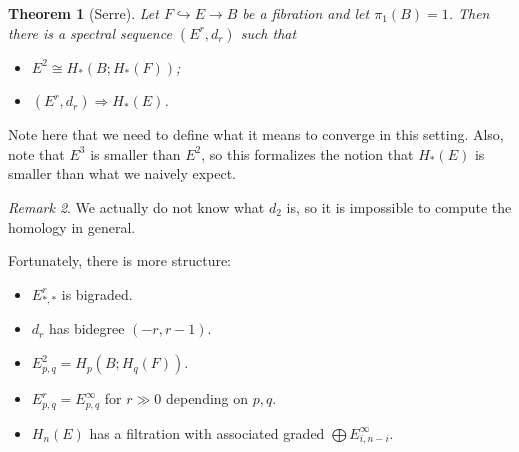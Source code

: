 \documentclass[leqno, openany]{memoir}
\newtheorem{thm}{Theorem}[section]
\theoremstyle{definition}
\theoremstyle{remark}
\newtheorem{rmk}[thm]{Remark}
\theoremstyle{plain}
\theoremstyle{definition}
\theoremstyle{remark}
\begin{document}
\begin{thm}[Serre]
    Let $F \hookrightarrow E \to B$ be a fibration and let $\pi_1(B) = 1$. Then there is a spectral sequence $(E^r, d_r)$ such that
    \begin{itemize}
        \item $E^2 \cong H_*(B; H_*(F))$;
        \item $(E^r, d_r) \Rightarrow H_*(E)$.
    \end{itemize}
\end{thm}

Note here that we need to define what it means to converge in this setting. Also, note that $E^3$ is smaller than $E^2$, so this formalizes the notion that $H_*(E)$ is smaller than what we naively expect.

\begin{rmk}
    We actually do not know what $d_2$ is, so it is impossible to compute the homology in general.
\end{rmk}

Fortunately, there is more structure:
\begin{itemize}
    \item $E^r_{*,*}$ is bigraded.
    \item $d_r$ has bidegree $(-r, r-1)$.
    \item $E_{p,q}^2 = H_p(B; H_q(F))$.
    \item $E_{p,q}^r = E_{p,q}^{\infty}$ for $r \gg 0$ depending on $p,q$.
    \item $H_n(E)$ has a filtration with associated graded $\bigoplus E_{i, n-i}^{\infty}$.
\end{itemize}
\end{document}
